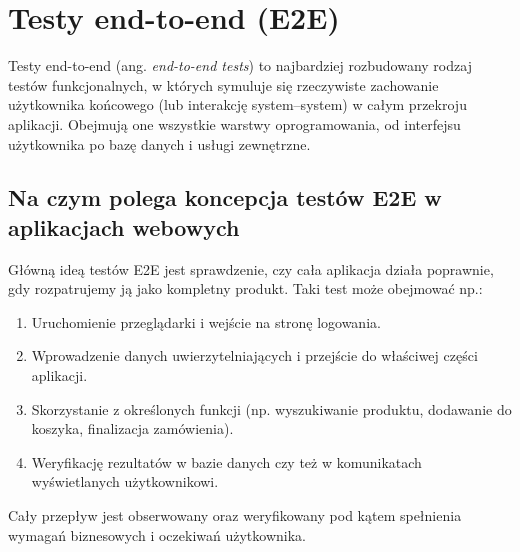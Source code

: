 \documentclass[12pt]{report}
\begin{document}

\section{Testy end-to-end (E2E)}
\label{sec:testy-end-to-end}
Testy end-to-end (ang. \emph{end-to-end tests}) to najbardziej rozbudowany rodzaj testów funkcjonalnych, w których symuluje się rzeczywiste zachowanie użytkownika końcowego (lub interakcję system–system) w całym przekroju aplikacji. Obejmują one wszystkie warstwy oprogramowania, od interfejsu użytkownika po bazę danych i usługi zewnętrzne.

\subsection*{Na czym polega koncepcja testów E2E w aplikacjach webowych}
Główną ideą testów E2E jest sprawdzenie, czy cała aplikacja działa poprawnie, gdy rozpatrujemy ją jako kompletny produkt. Taki test może obejmować np.:
\begin{enumerate}
    \item Uruchomienie przeglądarki i wejście na stronę logowania.
    \item Wprowadzenie danych uwierzytelniających i przejście do właściwej części aplikacji.
    \item Skorzystanie z określonych funkcji (np. wyszukiwanie produktu, dodawanie do koszyka, finalizacja zamówienia).
    \item Weryfikację rezultatów w bazie danych czy też w komunikatach wyświetlanych użytkownikowi.
\end{enumerate}
Cały przepływ jest obserwowany oraz weryfikowany pod kątem spełnienia wymagań biznesowych i oczekiwań użytkownika.
\end{document}
